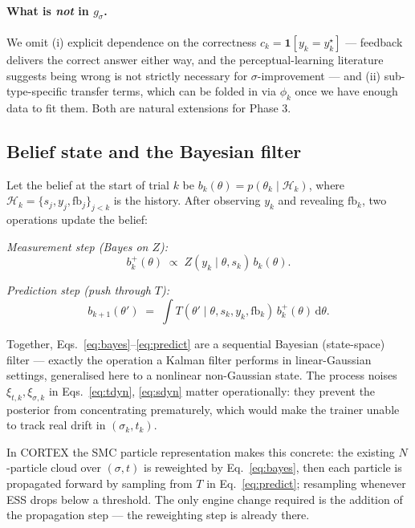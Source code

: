 \documentclass[11pt]{article}
\begin{document}
\paragraph{What is \emph{not} in $g_\sigma$.}
We omit (i) explicit dependence on the correctness $c_k = \mathbf{1}
[y_k = y_k^{\star}]$ — feedback delivers the correct answer either
way, and the perceptual-learning literature suggests being wrong is
not strictly necessary for $\sigma$-improvement — and (ii)
sub-type-specific transfer terms, which can be folded in via $\phi_k$
once we have enough data to fit them. Both are natural extensions for
Phase 3.

\subsection{Belief state and the Bayesian filter}
\label{sec:belief}

Let the belief at the start of trial $k$ be $b_k(\theta) = p(\theta_k
\mid \mathcal{H}_k)$, where $\mathcal{H}_k = \{s_j, y_j, \mathrm{fb}_j
\}_{j < k}$ is the history. After observing $y_k$ and revealing
$\mathrm{fb}_k$, two operations update the belief:

\smallskip
\noindent\emph{Measurement step (Bayes on $Z$):}
\begin{equation}
  b_k^{+}(\theta) \;\propto\; Z(y_k \mid \theta, s_k)\,b_k(\theta).
  \label{eq:bayes}
\end{equation}

\smallskip
\noindent\emph{Prediction step (push through $T$):}
\begin{equation}
  b_{k+1}(\theta') \;=\;
    \int T(\theta' \mid \theta, s_k, y_k, \mathrm{fb}_k)\,
         b_k^{+}(\theta)\,\mathrm{d}\theta.
  \label{eq:predict}
\end{equation}

Together, Eqs.~\ref{eq:bayes}--\ref{eq:predict} are a sequential
Bayesian (state-space) filter — exactly the operation a Kalman filter
performs in linear-Gaussian settings, generalised here to a nonlinear
non-Gaussian state. The process noises $\xi_{t,k}, \xi_{\sigma,k}$
in Eqs.~\ref{eq:tdyn}, \ref{eq:sdyn} matter operationally: they
prevent the posterior from concentrating prematurely, which would
make the trainer unable to track real drift in $(\sigma_k, t_k)$.

In CORTEX the SMC particle representation makes this concrete: the
existing $N$-particle cloud over $(\sigma, t)$ is reweighted by
Eq.~\ref{eq:bayes}, then each particle is propagated forward by
sampling from $T$ in Eq.~\ref{eq:predict}; resampling whenever
ESS drops below a threshold. The only engine change required is the
addition of the propagation step — the reweighting step is already
there.
\end{document}
